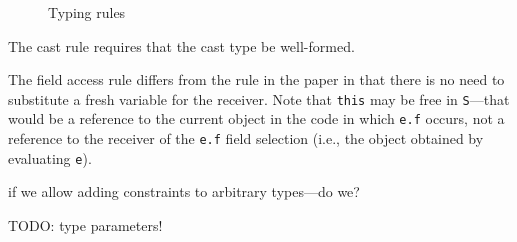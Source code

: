 \documentclass[preprint,nocopyrightspace,9pt]{sigplanconf}
\begin{document}
\begin{figure}

\caption{Typing rules}
\label{fig:typing}
\end{figure}

The cast rule
requires that the cast type be well-formed. 

The field access rule 
differs from the rule in the paper in that there is no need to
substitute a fresh variable for the receiver. Note that {\tt this} may be free
in {\tt S}---that would be a reference to the current object in the code in
which {\tt e.f} occurs, not a reference to the receiver of the {\tt e.f} field
selection (i.e., the object obtained by evaluating {\tt e}).

\noindent
if we allow adding constraints to arbitrary types---do we?

TODO: type parameters!
\end{document}
